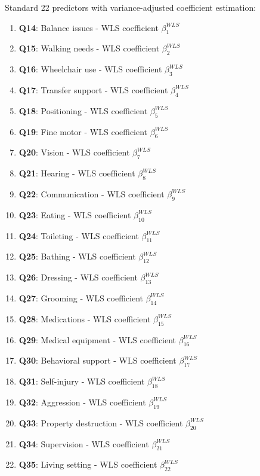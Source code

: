 Standard 22 predictors with variance-adjusted coefficient estimation:
\begin{enumerate}
    \item \textbf{Q14}: Balance issues - WLS coefficient $\beta_1^{WLS}$
    \item \textbf{Q15}: Walking needs - WLS coefficient $\beta_2^{WLS}$
    \item \textbf{Q16}: Wheelchair use - WLS coefficient $\beta_3^{WLS}$
    \item \textbf{Q17}: Transfer support - WLS coefficient $\beta_4^{WLS}$
    \item \textbf{Q18}: Positioning - WLS coefficient $\beta_5^{WLS}$
    \item \textbf{Q19}: Fine motor - WLS coefficient $\beta_6^{WLS}$
    \item \textbf{Q20}: Vision - WLS coefficient $\beta_7^{WLS}$
    \item \textbf{Q21}: Hearing - WLS coefficient $\beta_8^{WLS}$
    \item \textbf{Q22}: Communication - WLS coefficient $\beta_9^{WLS}$
    \item \textbf{Q23}: Eating - WLS coefficient $\beta_{10}^{WLS}$
    \item \textbf{Q24}: Toileting - WLS coefficient $\beta_{11}^{WLS}$
    \item \textbf{Q25}: Bathing - WLS coefficient $\beta_{12}^{WLS}$
    \item \textbf{Q26}: Dressing - WLS coefficient $\beta_{13}^{WLS}$
    \item \textbf{Q27}: Grooming - WLS coefficient $\beta_{14}^{WLS}$
    \item \textbf{Q28}: Medications - WLS coefficient $\beta_{15}^{WLS}$
    \item \textbf{Q29}: Medical equipment - WLS coefficient $\beta_{16}^{WLS}$
    \item \textbf{Q30}: Behavioral support - WLS coefficient $\beta_{17}^{WLS}$
    \item \textbf{Q31}: Self-injury - WLS coefficient $\beta_{18}^{WLS}$
    \item \textbf{Q32}: Aggression - WLS coefficient $\beta_{19}^{WLS}$
    \item \textbf{Q33}: Property destruction - WLS coefficient $\beta_{20}^{WLS}$
    \item \textbf{Q34}: Supervision - WLS coefficient $\beta_{21}^{WLS}$
    \item \textbf{Q35}: Living setting - WLS coefficient $\beta_{22}^{WLS}$
\end{enumerate}

